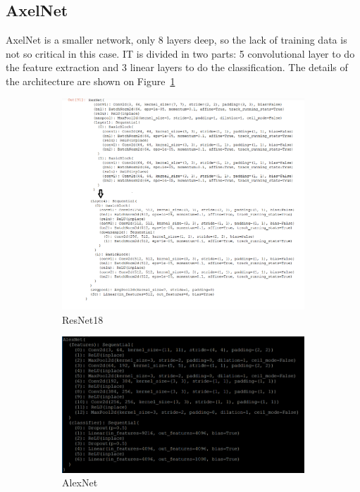 \subsection{AxelNet}
AxelNet is a smaller network, only 8 layers deep, so the lack of training data is not so critical in this case. IT is divided in two parts: 5 convolutional layer to do the feature extraction and 3 linear layers to do the classification.  The details of the architecture are shown on Figure~\ref{fig:resarchi}
\begin{figure}
\begin{subfigure}{.5\textwidth}
  \centering
  \includegraphics[width=.8\linewidth]{figures/03-Resnet_architecture}
  \caption{ResNet18}
  \label{fig:resarchi}
\end{subfigure}%
\begin{subfigure}{.5\textwidth}
  \centering
  \includegraphics[width=.8\linewidth]{figures/03-alexnet_architecture}
  \caption{AlexNet}
  \label{fig:alexarchi}
\end{subfigure}
\begin{subfigure}{.5\textwidth}
  \centering

\end{subfigure}
\end{figure}
